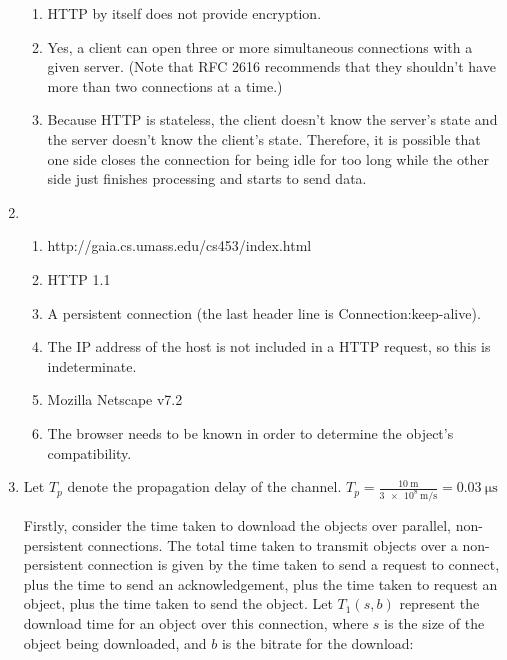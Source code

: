 \documentclass{article}
\begin{document}
\begin{enumerate}
\begin{enumerate}
\item HTTP by itself does not provide encryption.

\item Yes, a client can open three or more simultaneous connections with a given server. (Note that RFC 2616 recommends that they shouldn't have more than two connections at a time.)

\item Because HTTP is stateless, the client doesn't know the server's state and the server doesn't know the client's state. Therefore, it is possible that one side closes the connection for being idle for too long while the other side just finishes processing and starts to send data.

\end{enumerate}

\item
\begin{enumerate}

\item http://gaia.cs.umass.edu/cs453/index.html

\item HTTP 1.1

\item A persistent connection (the last header line is Connection:keep-alive).

\item The IP address of the host is not included in a HTTP request, so this is indeterminate.

\item Mozilla Netscape v7.2

\item The browser needs to be known in order to determine the object's compatibility.

\end{enumerate}

\item Let  $ T_p $ denote the propagation delay of the channel. $ T_p = \frac{\SI{10}{\metre}}{\SI{3e8}{\metre\per\second}} = \SI{0.03}{\micro\second} $

Firstly, consider the time taken to download the objects over parallel, non-persistent connections. The total time taken to transmit objects over a non-persistent connection is given by the time taken to send a request to connect, plus the time to send an acknowledgement, plus the time taken to request an object, plus the time taken to send the object. Let $ T_1(s, b) $ represent the download time for an object over this connection, where $ s $ is the size of the object being downloaded, and $ b $ is the bitrate for the download:


\end{enumerate}
\end{document}

